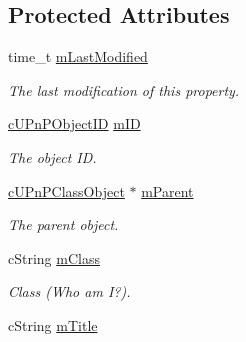 \subsection*{Protected Attributes}
\begin{CompactItemize}
\item 
\hypertarget{classcUPnPClassObject_3196f065470aac0fd027ff81225f18e1}{
time\_\-t \hyperlink{classcUPnPClassObject_3196f065470aac0fd027ff81225f18e1}{mLastModified}}
\label{classcUPnPClassObject_3196f065470aac0fd027ff81225f18e1}

\begin{CompactList}\small\item\em The last modification of this property. \item\end{CompactList}\item 
\hypertarget{classcUPnPClassObject_96ccf6ef7924ae0d440a87cc88221e08}{
\hyperlink{structcUPnPObjectID}{cUPnPObjectID} \hyperlink{classcUPnPClassObject_96ccf6ef7924ae0d440a87cc88221e08}{mID}}
\label{classcUPnPClassObject_96ccf6ef7924ae0d440a87cc88221e08}

\begin{CompactList}\small\item\em The object ID. \item\end{CompactList}\item 
\hypertarget{classcUPnPClassObject_bccecf0a80934f907c3ede2dfe5fc27d}{
\hyperlink{classcUPnPClassObject}{cUPnPClassObject} $\ast$ \hyperlink{classcUPnPClassObject_bccecf0a80934f907c3ede2dfe5fc27d}{mParent}}
\label{classcUPnPClassObject_bccecf0a80934f907c3ede2dfe5fc27d}

\begin{CompactList}\small\item\em The parent object. \item\end{CompactList}\item 
\hypertarget{classcUPnPClassObject_60875cd885a2ac83b5c8eba2f4b98c20}{
cString \hyperlink{classcUPnPClassObject_60875cd885a2ac83b5c8eba2f4b98c20}{mClass}}
\label{classcUPnPClassObject_60875cd885a2ac83b5c8eba2f4b98c20}

\begin{CompactList}\small\item\em Class (Who am I?). \item\end{CompactList}\item 
\hypertarget{classcUPnPClassObject_b31f0c0cb2d9761c90713a1744634ec6}{
cString \hyperlink{classcUPnPClassObject_b31f0c0cb2d9761c90713a1744634ec6}{mTitle}}
\label{classcUPnPClassObject_b31f0c0cb2d9761c90713a1744634ec6}


\end{CompactItemize}
